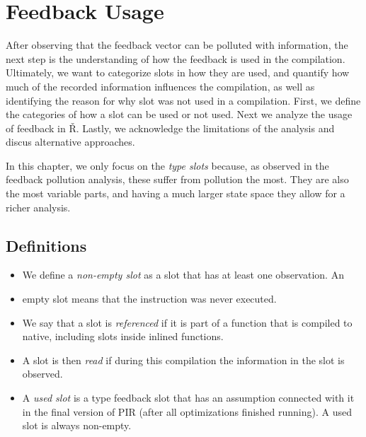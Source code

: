 \chapter{Feedback Usage}

\begin{chapterabstract}
	After observing that the feedback vector can be polluted with information, the next step is the understanding of how the feedback is used in the compilation. Ultimately, we want to categorize slots in how they are used, and quantify how much of the recorded information influences the compilation, as well as identifying the reason for why slot was not used in a compilation. First, we define the categories of how a slot can be used or not used. Next we analyze the usage of feedback in Ř. Lastly, we acknowledge the limitations of the analysis and discus alternative approaches.
\end{chapterabstract}

In this chapter, we only focus on the \textit{type slots} because, as observed in the feedback pollution analysis, these suffer from pollution the most. They are also the most variable parts, and having a much larger state space they allow for a richer analysis.

\section{Definitions}

\begin{itemize}
  \item{} We define a \textit{non-empty slot} as a slot that has at least one observation. An \item{empty} slot means that the instruction was never executed.
	\item{} We say that a slot is \textit{referenced} if it is part of a function that is compiled to native, including slots inside inlined functions.
	\item{} A slot is then \textit{read} if during this compilation the information in the slot is observed.
	\item{} A \textit{used slot} is a type feedback slot that has an assumption connected with it in the final version of PIR (after all optimizations finished running). A used slot is always non-empty.
\end{itemize}

